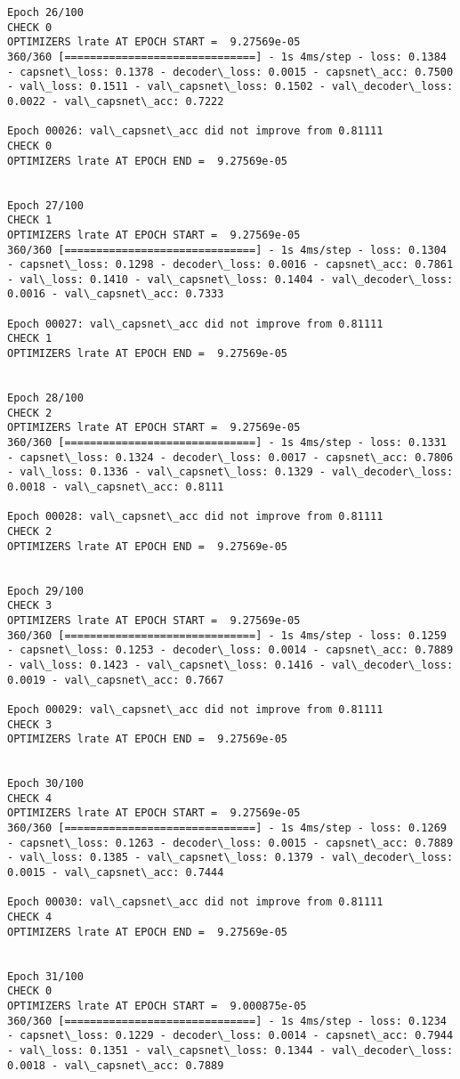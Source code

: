 \documentclass[11pt]{article}
\begin{document}
\begin{Verbatim}[commandchars=\\\{\}]
Epoch 26/100
CHECK 0
OPTIMIZERS lrate AT EPOCH START =  9.27569e-05
360/360 [==============================] - 1s 4ms/step - loss: 0.1384 - capsnet\_loss: 0.1378 - decoder\_loss: 0.0015 - capsnet\_acc: 0.7500 - val\_loss: 0.1511 - val\_capsnet\_loss: 0.1502 - val\_decoder\_loss: 0.0022 - val\_capsnet\_acc: 0.7222

Epoch 00026: val\_capsnet\_acc did not improve from 0.81111
CHECK 0
OPTIMIZERS lrate AT EPOCH END =  9.27569e-05 


Epoch 27/100
CHECK 1
OPTIMIZERS lrate AT EPOCH START =  9.27569e-05
360/360 [==============================] - 1s 4ms/step - loss: 0.1304 - capsnet\_loss: 0.1298 - decoder\_loss: 0.0016 - capsnet\_acc: 0.7861 - val\_loss: 0.1410 - val\_capsnet\_loss: 0.1404 - val\_decoder\_loss: 0.0016 - val\_capsnet\_acc: 0.7333

Epoch 00027: val\_capsnet\_acc did not improve from 0.81111
CHECK 1
OPTIMIZERS lrate AT EPOCH END =  9.27569e-05 


Epoch 28/100
CHECK 2
OPTIMIZERS lrate AT EPOCH START =  9.27569e-05
360/360 [==============================] - 1s 4ms/step - loss: 0.1331 - capsnet\_loss: 0.1324 - decoder\_loss: 0.0017 - capsnet\_acc: 0.7806 - val\_loss: 0.1336 - val\_capsnet\_loss: 0.1329 - val\_decoder\_loss: 0.0018 - val\_capsnet\_acc: 0.8111

Epoch 00028: val\_capsnet\_acc did not improve from 0.81111
CHECK 2
OPTIMIZERS lrate AT EPOCH END =  9.27569e-05 


Epoch 29/100
CHECK 3
OPTIMIZERS lrate AT EPOCH START =  9.27569e-05
360/360 [==============================] - 1s 4ms/step - loss: 0.1259 - capsnet\_loss: 0.1253 - decoder\_loss: 0.0014 - capsnet\_acc: 0.7889 - val\_loss: 0.1423 - val\_capsnet\_loss: 0.1416 - val\_decoder\_loss: 0.0019 - val\_capsnet\_acc: 0.7667

Epoch 00029: val\_capsnet\_acc did not improve from 0.81111
CHECK 3
OPTIMIZERS lrate AT EPOCH END =  9.27569e-05 


Epoch 30/100
CHECK 4
OPTIMIZERS lrate AT EPOCH START =  9.27569e-05
360/360 [==============================] - 1s 4ms/step - loss: 0.1269 - capsnet\_loss: 0.1263 - decoder\_loss: 0.0015 - capsnet\_acc: 0.7889 - val\_loss: 0.1385 - val\_capsnet\_loss: 0.1379 - val\_decoder\_loss: 0.0015 - val\_capsnet\_acc: 0.7444

Epoch 00030: val\_capsnet\_acc did not improve from 0.81111
CHECK 4
OPTIMIZERS lrate AT EPOCH END =  9.27569e-05 


Epoch 31/100
CHECK 0
OPTIMIZERS lrate AT EPOCH START =  9.000875e-05
360/360 [==============================] - 1s 4ms/step - loss: 0.1234 - capsnet\_loss: 0.1229 - decoder\_loss: 0.0014 - capsnet\_acc: 0.7944 - val\_loss: 0.1351 - val\_capsnet\_loss: 0.1344 - val\_decoder\_loss: 0.0018 - val\_capsnet\_acc: 0.7889


\end{Verbatim}
\end{document}
